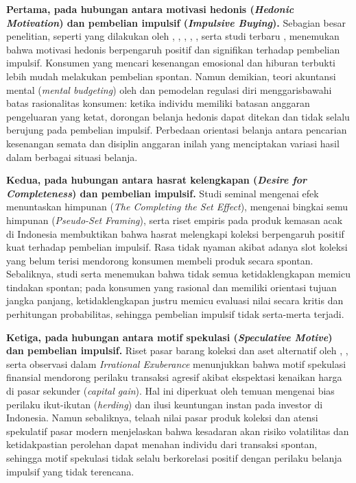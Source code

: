 \documentclass[12pt,a4paper]{article}
\numberwithin{equation}{section}
\numberwithin{table}{section}
\numberwithin{figure}{section}
\begin{document}
\textbf{Pertama, pada hubungan antara motivasi hedonis (\emph{Hedonic Motivation}) dan pembelian impulsif (\emph{Impulsive Buying}).} Sebagian besar penelitian, seperti yang dilakukan oleh \citet{arnold2003hedonic}, \citet{mariyana2023influence}, \citet{pranggabayu2022pengaruh}, \citet{tirtayasa2020effect}, \citet{zheng2019impact}, serta studi terbaru \citet{gong2024unveiling}, menemukan bahwa motivasi hedonis berpengaruh positif dan signifikan terhadap pembelian impulsif. Konsumen yang mencari kesenangan emosional dan hiburan terbukti lebih mudah melakukan pembelian spontan. Namun demikian, teori akuntansi mental (\emph{mental budgeting}) oleh \citet{skwara2023effects} dan pemodelan regulasi diri \citep{baumeister2024selfcontrol} menggarisbawahi batas rasionalitas konsumen: ketika individu memiliki batasan anggaran pengeluaran yang ketat, dorongan belanja hedonis dapat ditekan dan tidak selalu berujung pada pembelian impulsif. Perbedaan orientasi belanja antara pencarian kesenangan semata dan disiplin anggaran inilah yang menciptakan variasi hasil dalam berbagai situasi belanja.

\textbf{Kedua, pada hubungan antara hasrat kelengkapan (\emph{Desire for Completeness}) dan pembelian impulsif.} Studi seminal \citet{gao2014completing} mengenai efek menuntaskan himpunan (\emph{The Completing the Set Effect}), \citet{barasz2017pseudo} mengenai bingkai semu himpunan (\emph{Pseudo-Set Framing}), serta riset empiris \citet{dewi2026understanding} pada produk kemasan acak di Indonesia membuktikan bahwa hasrat melengkapi koleksi berpengaruh positif kuat terhadap pembelian impulsif. Rasa tidak nyaman akibat adanya slot koleksi yang belum terisi mendorong konsumen membeli produk secara spontan. Sebaliknya, studi \citet{zhang2022uncertainty} serta \citet{chan2017state} menemukan bahwa tidak semua ketidaklengkapan memicu tindakan spontan; pada konsumen yang rasional dan memiliki orientasi tujuan jangka panjang, ketidaklengkapan justru memicu evaluasi nilai secara kritis dan perhitungan probabilitas, sehingga pembelian impulsif tidak serta-merta terjadi.

\textbf{Ketiga, pada hubungan antara motif spekulasi (\emph{Speculative Motive}) dan pembelian impulsif.} Riset pasar barang koleksi dan aset alternatif oleh \citet{baur2018bitcoin}, \citet{aryadi2024personal}, serta observasi \citet{shiller2000irrational} dalam \emph{Irrational Exuberance} menunjukkan bahwa motif spekulasi finansial mendorong perilaku transaksi agresif akibat ekspektasi kenaikan harga di pasar sekunder (\emph{capital gain}). Hal ini diperkuat oleh temuan \citet{colline2024biases} mengenai bias perilaku ikut-ikutan (\emph{herding}) dan ilusi keuntungan instan pada investor di Indonesia. Namun sebaliknya, telaah nilai pasar produk koleksi \citep{aquino2024expecting} dan atensi spekulatif pasar modern \citep{alfina2023fomo} menjelaskan bahwa kesadaran akan risiko volatilitas dan ketidakpastian perolehan dapat menahan individu dari transaksi spontan, sehingga motif spekulasi tidak selalu berkorelasi positif dengan perilaku belanja impulsif yang tidak terencana.
\end{document}
